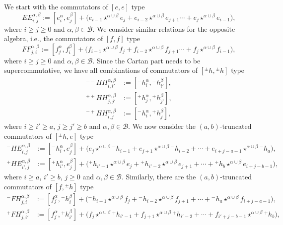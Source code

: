 \documentclass[10pt]{amsart}
\newcommand{\CB}{\mathcal{B}}
\newcommand{\+}{{}^+}
\theoremstyle{definition}
\theoremstyle {definition}
\theoremstyle {definition}
\begin{document}
We start with the commutators of $[e,e]$ type
\begin{equation*}
    EE^{\alpha,\beta}_{i,j}:=[e_i^\alpha,e^\beta_{j}]+\big(e_{i-1}\star^{\alpha\cup \beta}e_{j}+e_{i-2}\star^{\alpha\cup \beta}e_{j+1}\cdots + e_{j}\star^{\alpha\cup \beta}e_{i-1}\big),
\end{equation*}
where $i\geq j\geq 0$ and $\alpha,\beta\in \CB$. We consider similar relations for the opposite algebra, i.e., the commutators of $[f,f]$ type
\begin{equation*}
    FF^{\alpha,\beta}_{j,i}:=[f_j^\alpha,f^\beta_{i}]+\big(f_{i-1}\star^{\alpha\cup \beta}f_{j}+f_{i-2}\star^{\alpha\cup \beta}f_{j+1}\cdots + f_{j}\star^{\alpha\cup \beta}f_{i-1}\big),
\end{equation*}
where $i\geq j\geq 0$ and $\alpha,\beta\in \CB$. Since the Cartan part needs to be supercommutative, we have all combinations of commutators of $[{}^{\pm}h,{}^{\pm}h]$ type
\begin{align*}
    {}^{--}H{}H^{\alpha,\beta}_{i, i'}&:=[{}^{-}h^\alpha_{i},{}^{-}h^{\beta}_{i'}],\\
    {}^{++}HH^{\alpha,\beta}_{j, j'}&:=[{}^{+}h^\alpha_{j},{}^{+}h^{\beta}_{j'}],\\
    {}^{-+}HH^{\alpha,\beta}_{i,j}&:=[{}^{-}h^\alpha_{i},{}^{+}h^{\beta}_{j}],
\end{align*}
where $i\geq i'\geq a$, $j\geq j'\geq b$ and $\alpha,\beta\in \CB$. We now consider the $(a,b)$-truncated commutators of $[{}^{\pm}h,e]$ type
\begin{align*}
    {}^-HE^{\alpha,\beta}_{i,j}&:=[{}^{-}h_i^\alpha,e^\beta_j]+\big(e_{j}\star^{\alpha\cup\beta}{}^{-}h_{i-1}   +e_{j+1}\star^{\alpha\cup\beta}{}^{-}h_{i-2}+\cdots+e_{i+j-a-1}\star^{\alpha\cup\beta}{}^{-}h_{a}\big),\\
    {}^+HE^{\alpha,\beta}_{i',j}&:=[\+h_{i'}^\alpha,e^\beta_j]+\big(\+h_{{i'}-1}\star^{\alpha\cup\beta}e_{j}+\+h_{{i'}-2}\star^{\alpha\cup\beta}e_{j+1}+\cdots+{}^{+}h_{b}\star^{\alpha\cup\beta}e_{i+j-b-1}\big),
\end{align*}
where $i\geq a$, $i'\geq b$, $j\geq 0$ and $\alpha,\beta\in \CB$. Similarly, there are the $(a,b)$-truncated commutators of $[f,{}^{\pm}h]$ type
\begin{align*}
    {}^{-}FH_{j,i}^{\alpha,\beta}
    &:=[f^\alpha_j,{}^{-}h_i^\beta]
    +\big({}^{-}h_{i-1}\star^{\alpha\cup\beta}f_{j}+{}^{-}h_{i-2}\star^{\alpha\cup\beta}f_{j+1}+\cdots+{}^{-}h_{a}\star^{\alpha\cup\beta}f_{i+j-a-1}\big),\\
    {}^{+}FH_{j,i'}^{\alpha,\beta}
    &:=[f^\alpha_j,{}^{+}h_{i'}^\beta]
    +\big(f_{j}\star^{\alpha\cup\beta}{}^{+}h_{i'-1}   +f_{j+1}\star^{\alpha\cup\beta}{}^{+}h_{i'-2}+\cdots+f_{i'+j-b-1}\star^{\alpha\cup\beta}{}^{+}h_{b}\big),
\end{align*}
\end{document}
